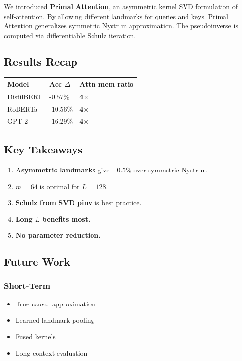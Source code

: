 We introduced \textbf{Primal Attention}, an asymmetric kernel SVD formulation 
of self-attention. By allowing different landmarks for queries and keys, 
Primal Attention generalizes symmetric Nystr m approximation. The pseudoinverse 
is computed via differentiable Schulz iteration.

\subsection{Results Recap}

\begin{table}[H]
\centering
\small
\begin{tabular}{lll}
\toprule
\textbf{Model} & \textbf{Acc $\Delta$} & \textbf{Attn mem ratio} \\
\midrule
DistilBERT & -0.57\% & \textbf{4$\times$} \\
RoBERTa & -10.56\% & \textbf{4$\times$} \\
GPT-2 & -16.29\% & \textbf{4$\times$} \\
\bottomrule
\end{tabular}
\end{table}

\subsection{Key Takeaways}

\begin{enumerate}
\item \textbf{Asymmetric landmarks} give +0.5\% over symmetric Nystr m.
\item \textbf{$m = 64$} is optimal for $L = 128$.
\item \textbf{Schulz from SVD pinv} is best practice.
\item \textbf{Long $L$ benefits most.}
\item \textbf{No parameter reduction.}

\end{enumerate}
\subsection{Future Work}

\subsubsection{Short-Term}
\begin{itemize}
\item True causal approximation
\item Learned landmark pooling
\item Fused kernels
\item Long-context evaluation

\end{itemize}
